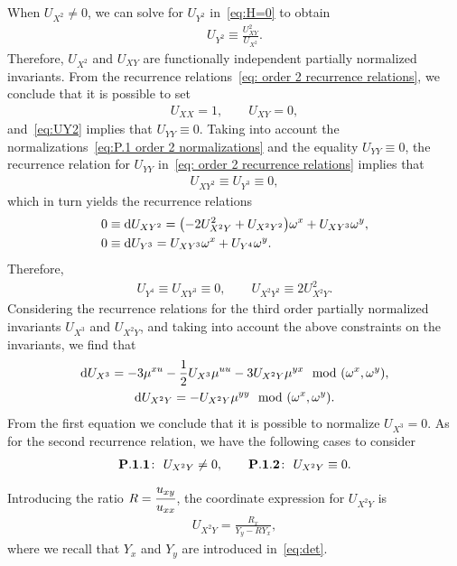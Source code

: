 \documentclass[10pt,a4paper]{amsart}
\numberwithin{equation}{section}
\begin{document}
When $U_{X^2}\neq 0$, we can solve for $U_{Y^2}$ in~\eqref{eq:H=0} to obtain
%
\begin{gather}\label{eq:UY2}
U_{Y^2} \equiv \frac{U_{XY}^2}{U_{X^2}}.
\end{gather}
%
Therefore, $U_{X^2}$ and $U_{XY}$ are functionally independent partially normalized invariants. From the recurrence relations~\eqref{eq: order 2 recurrence relations}, we conclude that it is possible to set
%
\begin{gather}\label{eq:P.1 order 2 normalizations}
U_{XX}=1,\qquad U_{XY}=0,
\end{gather}
%
and~\eqref{eq:UY2} implies that $U_{YY} \equiv 0$. Taking into account the normalizations~\eqref{eq:P.1 order 2 normalizations} and the equality $U_{YY}\equiv 0$, the recurrence relation for $U_{YY}$ in~\eqref{eq: order 2 recurrence relations} implies that
%
\begin{gather}\label{eq:P.1 order 3 constraints}
U_{XY^2} \equiv U_{Y^3} \equiv 0,
\end{gather}
%
which in turn yields the recurrence relations
%
\begin{align*}
0 &\equiv {\rm d}U_{XY^2} = \big({-}2U_{X^2Y}^2 + U_{X^2Y^2}\big)\omega^x + U_{XY^3}\omega^y,\\
0 &\equiv {\rm d}U_{Y^3} = U_{XY^3}\omega^x + U_{Y^4}\omega^y.
\end{align*}
%
Therefore,
%
\begin{gather}\label{eq:order 4 constraints}
U_{Y^4}\equiv U_{XY^3}\equiv 0,\qquad U_{X^2Y^2}\equiv 2U_{X^2Y}^2.
\end{gather}
%
Considering the recurrence relations for the third order partially normalized invariants $U_{X^3}$ and $U_{X^2Y}$, and taking into account the above constraints on the invariants, we find that
\begin{gather*}
{\rm d}U_{X^3} = - 3\mu^{xu} - \frac{1}{2}U_{X^3}\mu^{uu}-3U_{X^2Y}\mu^{yx} \mod(\omega^x,\omega^y),
\\
{\rm d}U_{X^2Y} = -U_{X^2Y}\mu^{yy} \mod(\omega^x,\omega^y).
\end{gather*}
%
From the first equation we conclude that it is possible to normalize $U_{X^3}=0$. As for the second recurrence relation, we have the following cases to consider
%
\begin{gather*}
{\bf P.1.1}\colon\ U_{X^2Y}\neq 0,\qquad
{\bf P.1.2}\colon\ U_{X^2Y}\equiv 0.
\end{gather*}
Introducing the ratio $R= \cfrac{u_{xy}}{u_{xx}}$, the coordinate expression for $U_{X^2Y}$ is
\begin{gather*}
U_{X^2Y} = \frac{R_x}{Y_y-RY_x},
\end{gather*}
where we recall that $Y_x$ and $Y_y$ are introduced in~\eqref{eq:det}.
\end{document}

